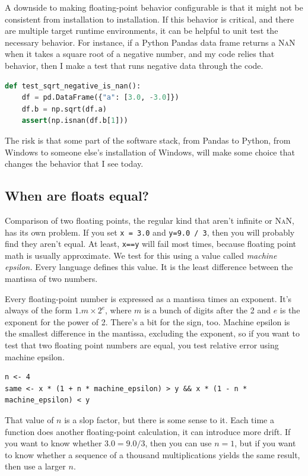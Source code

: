 \documentclass[fleqn,10pt]{olplainarticle}
\newcommand{\nan}{\textsc{NaN}\xspace}
\begin{document}
A downside to making floating-point behavior configurable is that
it might not be consistent from installation to installation.
If this behavior is critical, and there are multiple target runtime
environments, it can be helpful to unit test the necessary behavior.
For instance, if a Python Pandas data frame returns a \nan when it
takes a square root of a negative number, and my code relies that behavior,
then I make a test that runs negative data through the code.
\begin{lstlisting}[language=Python]
def test_sqrt_negative_is_nan():
    df = pd.DataFrame({"a": [3.0, -3.0]})
    df.b = np.sqrt(df.a)
    assert(np.isnan(df.b[1]))
\end{lstlisting}
The risk is that some part of the software stack, from Pandas to Python, from
Windows to someone else's installation of Windows,
will make some choice that changes the behavior that I see today.


\subsection{When are floats equal?}

Comparison of two floating points, the regular kind that aren't
infinite or \nan, has its own problem. If you set
\lstinline!x = 3.0! and \lstinline!y=9.0 / 3!, then you will probably find they
aren't equal. At least, \lstinline!x==y! will fail most times, because
floating point math is usually approximate. We test for this
using a value called \emph{machine epsilon.} Every language defines
this value. It is the least difference between the
mantissa of two numbers.

Every floating-point number is expressed as a mantissa times
an exponent. It's always of the form $1.m \times 2^e$, where
$m$ is a bunch of digits after the 2 and $e$ is the exponent
for the power of 2. There's a bit for the sign, too.
Machine epsilon is the smallest difference in the mantissa,
excluding the exponent, so if you want to test that two
floating point numbers are equal, you test relative error using
machine epsilon.
\begin{lstlisting}
n <- 4
same <- x * (1 + n * machine_epsilon) > y && x * (1 - n * machine_epsilon) < y
\end{lstlisting}
That value of $n$ is a slop factor, but there is some sense
to it. Each time a function does another floating-point calculation,
it can introduce more drift. If you want to know whether
$3.0 = 9.0 / 3$, then you can use $n=1$, but if you want to know
whether a sequence of a thousand multiplications yields the
same result, then use a larger $n$.
\end{document}
